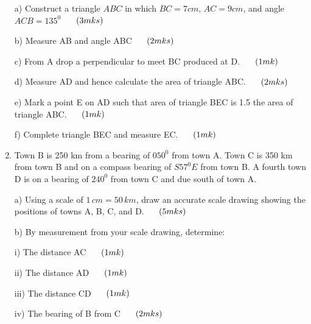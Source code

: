 \documentclass[
  a4paperpaper,
]{scrbook}
\begin{document}
\begin{tcolorbox}
\begin{enumerate}
  a) Construct a triangle \(ABC\) in which \(BC=7cm\), \(AC=9cm\), and
  angle \(ACB=135^0\) \(\hspace{0.5cm}(3mks)\)

  b) Measure AB and angle ABC \(\hspace{0.5cm} (2mks)\)

  c) From A drop a perpendicular to meet BC produced at D.
  \(\hspace{0.5cm}(1mk)\)

  d) Measure AD and hence calculate the area of triangle ABC.
  \(\hspace{0.5cm}(2mks)\)

  e) Mark a point E on AD such that area of triangle BEC is 1.5 the area
  of triangle ABC. \(\hspace{0.5cm} (1mk)\)

  f) Complete triangle BEC and measure EC. \(\hspace{0.5cm} (1mk)\)
\item
  Town B is 250 km from a bearing of \(050^0\) from town A. Town C is
  350 km from town B and on a compass bearing of \(S57^0E\) from town B.
  A fourth town D is on a bearing of \(240^0\) from town C and due south
  of town A.

  a) Using a scale of \(1\,cm=50 \,km\), draw an accurate scale drawing
  showing the positions of towns A, B, C, and D.
  \(\hspace{0.5cm} (5mks)\)

  b) By measurement from your scale drawing, determine:

  i) The distance AC \(\hspace{0.5cm} (1mk)\)

  ii) The distance AD \(\hspace{0.5cm} (1mk)\)

  iii) The distance CD \(\hspace{0.5cm} (1mk)\)

  iv) The bearing of B from C \(\hspace{0.5cm} (2mks)\)
\end{enumerate}

\end{tcolorbox}
\end{document}
